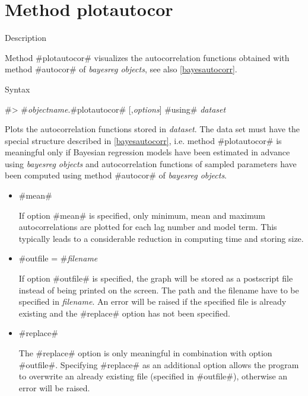 \clearpage



\section{Method plotautocor}
\label{graphplotautocor} 

\begin{stanza}{Description}

{Method #plotautocor# visualizes the autocorrelation functions
obtained with method #autocor# of {\em bayesreg objects}, see also
\autoref{bayesautocorr}.}
\end{stanza}


\begin{stanza}{Syntax}

{#> #{\em objectname}.#plotautocor# [,{\em options}] #using# {\em dataset}

Plots the autocorrelation functions stored in {\em dataset}. The
data set must have the special structure described in
\autoref{bayesautocorr}, i.e. method #plotautocor# is meaningful
only if Bayesian regression models have been estimated in advance
using {\em bayesreg objects} and autocorrelation functions of
sampled parameters have been computed using method #autocor# of
{\em bayesreg objects}.}
\end{stanza}


\begin{itemize}
\item #mean#

If option #mean# is specified, only minimum, mean and maximum
autocorrelations are plotted for each lag number and model term.
This typically leads to a considerable reduction in computing time
and storing size.

\item #outfile = #{\em filename}

If option #outfile# is specified, the graph will be stored as a
postscript file instead of being printed on the screen. The path
and the filename have to be specified in {\em filename}. An error
will be raised if the specified file is already existing and the
#replace# option has not been specified.

\item #replace#

The #replace# option is only meaningful in combination with option
#outfile#. Specifying #replace# as an additional option allows the
program to overwrite an already existing file (specified in
#outfile#), otherwise an error will be raised.
\end{itemize}



